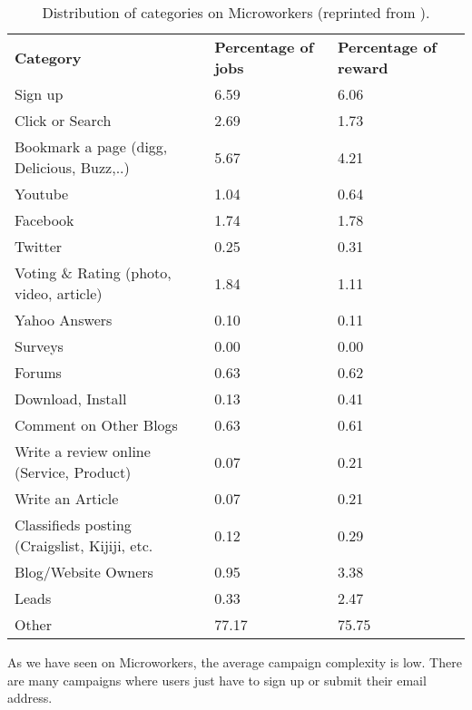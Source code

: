 \begin{table}[H]
    \begin{center}
		\begin{tabular}{lp{2cm}p{2cm}}
			\hline
			\textbf{Category} & \textbf{Percentage of jobs} & \textbf{Percentage of reward}\\
			\hhline{===}
            Sign up & 6.59 & 6.06\\
			\hline
            Click or Search & 2.69 & 1.73\\
			\hline
            Bookmark a page (digg, Delicious, Buzz,..) & 5.67 & 4.21\\
			\hline
            Youtube & 1.04 & 0.64\\
			\hline
            Facebook & 1.74 & 1.78\\
			\hline
            Twitter & 0.25 & 0.31\\
			\hline
            Voting \& Rating (photo, video, article) & 1.84 & 1.11\\
			\hline
            Yahoo Answers & 0.10 & 0.11\\
			\hline
            Surveys & 0.00 & 0.00\\
			\hline
            Forums & 0.63 & 0.62\\
			\hline
            Download, Install & 0.13 & 0.41\\
			\hline
            Comment on Other Blogs & 0.63 & 0.61\\
			\hline
            Write a review online (Service, Product) & 0.07 & 0.21\\
			\hline
            Write an Article & 0.07 & 0.21\\
			\hline
            Classifieds posting (Craigslist, Kijiji, etc. & 0.12 & 0.29\\
			\hline
			Blog/Website Owners & 0.95 & 3.38 \\
			\hline
			Leads & 0.33 & 2.47\\
			\hline
			Other & 77.17 & 75.75\\
			\hline
		\end{tabular}
	    \caption{Distribution of categories on Microworkers (reprinted from \cite{Hirth:2011}).}
        \label{tab:cat_microworkers}
    \end{center}
\end{table}

As we have seen on Microworkers, the average campaign complexity is low. There are many campaigns where users just have to sign up or submit their email address.
\newline


